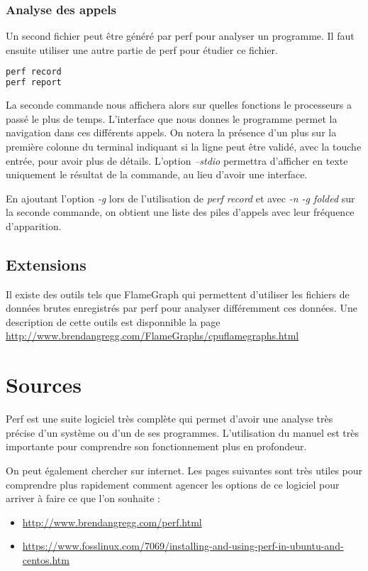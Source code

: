 \documentclass[a4paper, 12pt]{article}
\begin{document}
    \subsubsection{Analyse des appels}
    Un second fichier peut être généré par perf pour analyser un programme. Il faut ensuite utiliser une autre partie de perf pour étudier ce fichier.
    \begin{mdframed}[backgroundcolor=light-gray, roundcorner=20pt,
        innerleftmargin=20, innertopmargin=1, innerbottommargin=1, 
        outerlinewidth=1, linecolor=darkgray]
        \begin{lstlisting}[language=Bash]
perf record
perf report 
        \end{lstlisting}
    \end{mdframed}

    La seconde commande nous affichera alors sur quelles fonctions le processeurs a passé le plus de temps. L'interface que nous donnes le programme permet
    la navigation dans ces différents appels. On notera la présence d'un plus sur la première colonne du terminal indiquant si la ligne peut être validé, avec la touche entrée, pour avoir plus de détails.
    L'option \emph{--stdio} permettra d'afficher en texte uniquement le résultat de la commande, au lieu d'avoir une interface.

    En ajoutant l'option \emph{-g} lors de l'utilisation de \emph{perf record} et avec \emph{-n -g folded} sur la seconde commande,
    on obtient une liste des piles d'appels avec leur fréquence d'apparition.

\subsection{Extensions}
    Il existe des outils tels que FlameGraph qui permettent d'utiliser les fichiers de données brutes enregistrés par perf pour analyser différemment ces données.
    Une description de cette outils est disponnible la page \url{http://www.brendangregg.com/FlameGraphs/cpuflamegraphs.html}

\section{Sources}
    Perf est une suite logiciel très complète qui permet d'avoir une analyse très précise d'un système ou d'un de ses programmes.
    L'utilisation du manuel est très importante pour comprendre son fonctionnement plus en profondeur.

    On peut également chercher sur internet. Les pages suivantes sont très utiles pour comprendre plus rapidement comment agencer les options de ce logiciel pour arriver à faire ce que l'on souhaite :
    \begin{itemize}
        \item \url{http://www.brendangregg.com/perf.html}
        \item \url{https://www.fosslinux.com/7069/installing-and-using-perf-in-ubuntu-and-centos.htm}
    \end{itemize}
\end{document}
